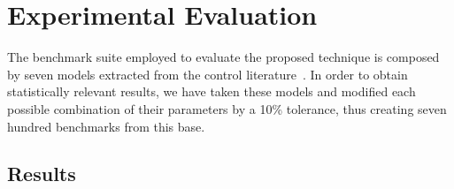 \documentclass[sigconf]{llncs}
\renewcommand{\note}[1]{\textcolor{red}{[#1]}}
\begin{document}
\section{Experimental Evaluation}
\label{exp:evaluation}

The benchmark suite employed to evaluate the proposed technique is 
composed by seven models extracted from the control literature~\cite{acrobot,cstr,CHEN1979389,KOKOTOVIC198023,gajic2008optimal,Franklin15,maglev,converters}.
In order to obtain statistically relevant results, we have taken these models
and modified each possible combination of their parameters by a 10\% tolerance,
thus creating seven hundred benchmarks from this base.


\subsection{Results}
\label{exp:results}
\end{document}
